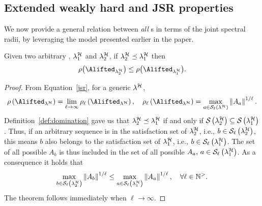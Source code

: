 \subsection{Extended weakly hard and JSR properties}
\label{sec:analytic_results}
%
We now provide a general relation between \emph{all} \ewhc{}s in terms of the joint spectral radii, by leveraging the model presented earlier in the paper.

\begin{theorem}%
    \label{th:rho_dominance_general}%
    Given two arbitrary \ewhc{}, $\lambda_1^{\mathcal{H}}$ and $\lambda_2^{\mathcal{H}}$, if $\lambda_2^{\mathcal{H}} \preceq \lambda_1^{\mathcal{H}}$ then
    \begin{equation*}
        \rho\bigl(\Alifted_{\lambda_2^\strat}\bigr) \leq \rho\bigl(\Alifted_{\lambda_1^\strat}\bigr).
    \end{equation*}

    \begin{proof}
        From Equation~\eqref{jsr}, for a generic \ewhc{} $\lambda^{\mathcal{H}}$,
        \begin{equation*}
            \rho\left(\Alifted_{\lambda^\strat}\right) = \lim_{\ell\rightarrow \infty}\rho_\ell\left(\Alifted_{\lambda^\strat}\right), \quad \rho_\ell\left(\Alifted_{\lambda^\strat}\right) = \max_{a \in \sset{\ell}{\lambda^\strat}}\norm{A_{a}}^{1/\ell}.
        \end{equation*}
        Definition~\ref{def:domination} gave us that $\lambda^{\mathcal{H}}_2 \preceq \lambda^{\mathcal{H}}_1$ if and only if $\mathcal{S}_{}\left( \lambda^{\mathcal{H}}_2 \right) \subseteq \mathcal{S}_{}\left( \lambda^{\mathcal{H}}_1 \right)$.
        Thus, if an arbitrary sequence is in the satisfaction set of $\lambda^{\mathcal{H}}_2$, i.e., $b \in \mathcal{S}_{\ell}\left(  \lambda^{\mathcal{H}}_2  \right)$, this means $b$ also belongs to the satisfaction set of $\lambda^{\mathcal{H}}_1$, i.e., $b \in \mathcal{S}_{\ell}\left(  \lambda^{\mathcal{H}}_1  \right)$.
        The set of all possible $A_{b}$ is thus included in the set of all possible $A_{a},\, a \in \mathcal{S}_{\ell}\left(  \lambda^{\mathcal{H}}_1  \right)$.
        As a consequence it holds that
        \begin{equation*}
            \max_{b \in \mathcal{S}_{\ell}\left( \lambda^{\mathcal{H}}_2 \right)}\left\lVert A_{b}\right\rVert^{1/\ell} \leq
            \max_{a \in \mathcal{S}_{\ell}\left( \lambda^{\mathcal{H}}_1 \right)}\left\lVert A_{a}\right\rVert^{1/\ell}, \quad
            \forall \ell\in\mathbb{N}^{>}.
        \end{equation*}
        The theorem follows immediately when $\ell\rightarrow \infty$.
    \end{proof}
\end{theorem}

